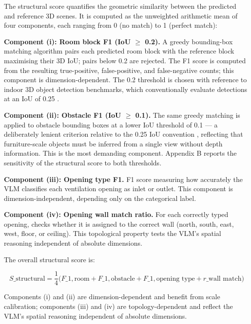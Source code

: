 \documentclass[preprint,12pt,number]{elsarticle}
\begin{document}
The structural score quantifies the geometric similarity between the predicted and reference 3D scenes. It is computed as the unweighted arithmetic mean of four components, each ranging from 0 (no match) to 1 (perfect match):

\textbf{Component (i): Room block F1 (IoU $\geq$ 0.2).} A greedy bounding-box matching algorithm pairs each predicted room block with the reference block maximising their 3D IoU; pairs below 0.2 are rejected. The F1 score is computed from the resulting true-positive, false-positive, and false-negative counts; this component is dimension-dependent. The 0.2 threshold is chosen with reference to indoor 3D object detection benchmarks, which conventionally evaluate detections at an IoU of 0.25 \cite{qi.etal2019DeepHough,dai.etal2017ScanNetRichlyAnnotated,song.etal2015SUNRGBD}.

\textbf{Component (ii): Obstacle F1 (IoU $\geq$ 0.1).} The same greedy matching is applied to obstacle bounding boxes at a lower IoU threshold of 0.1 --- a deliberately lenient criterion relative to the 0.25 IoU convention \cite{qi.etal2019DeepHough}, reflecting that furniture-scale objects must be inferred from a single view without depth information. This is the most demanding component. Appendix B reports the sensitivity of the structural score to both thresholds.

\textbf{Component (iii): Opening type F1.} F1 score measuring how accurately the VLM classifies each ventilation opening as inlet or outlet. This component is dimension-independent, depending only on the categorical label.

\textbf{Component (iv): Opening wall match ratio.} For each correctly typed opening, checks whether it is assigned to the correct wall (north, south, east, west, floor, or ceiling). This topological property tests the VLM's spatial reasoning independent of absolute dimensions.

The overall structural score is:

\begin{equation}
S\_\text{structural} = \frac{1}{4}\bigl(F\_{1,\text{room}} + F\_{1,\text{obstacle}} + F\_{1,\text{opening type}} + r\_\text{wall match}\bigr)
\label{eq:structural-score}
\end{equation}

Components (i) and (ii) are dimension-dependent and benefit from scale calibration; components (iii) and (iv) are topology-dependent and reflect the VLM's spatial reasoning independent of absolute dimensions.
\end{document}
